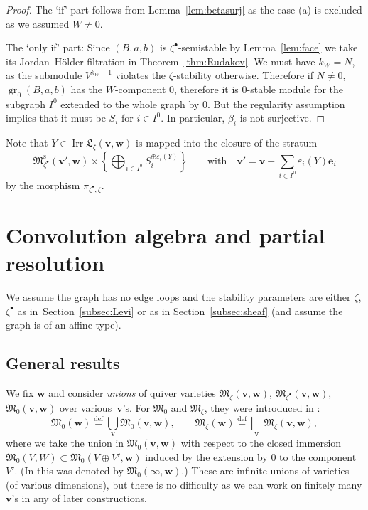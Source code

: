 \documentclass[pdftex]{sigma}
\theoremstyle{definition}
\numberwithin{equation}{section}
\newcommand{\thmref}[1]{Theorem~\ref{#1}}
\newcommand{\lemref}[1]{Lemma~\ref{#1}}
\newcommand{\subsecref}[1]{Section~\ref{#1}}
\newcommand{\defeq}{\overset{\operatorname{\scriptstyle def}}{=}}
\newcommand{\M}{{\mathfrak M}} %
\newcommand{\Mreg}{\M^{\operatorname{s}}}
\newcommand{\La}{{\mathfrak L}} %
\newcommand{\bv}{{\mathbf v}} %
\newcommand{\bw}{{\mathbf w}} %
\newcommand{\be}{{\mathbf e}}
\newcommand{\gr}{\operatorname{gr}} %
\newcommand{\Irr}{\operatorname{Irr}}
\begin{document}
\begin{proof}
The `if' part follows from \lemref{lem:betasurj} as the case (a) is
excluded as we assumed $W\neq 0$.

The `only if' part: Since $(B,a,b)$ is $\zeta^\bullet$-semistable by
\lemref{lem:face} we take its Jordan--H\"older f\/iltration in
\thmref{thm:Rudakov}. We must have $k_W = N$, as the submodule
$V^{k_W+1}$ violates the $\zeta$-stability otherwise. Therefore if $N
\neq 0$, $\gr_0(B,a,b)$ has the $W$-component $0$, therefore it is
$0$-stable module for the subgraph $I^0$ extended to the whole graph
by $0$. But the regularity assumption implies that it must be $S_i$
for $i\in I^0$. In particular, $\beta_i$ is not surjective.
\end{proof}

Note that $Y\in\Irr\La_\zeta(\bv,\bw)$ is mapped into the closure of
the stratum
\begin{equation*}
   \Mreg_{\zeta^\bullet}(\bv',\bw) \times \left\{ \bigoplus_{i\in I^0}
   S_i^{\oplus \varepsilon_i(Y)} \right\} \qquad\text{with}\quad
   \bv' = \bv - \sum_{i\in I^0} \varepsilon_i(Y) \be_i
\end{equation*}
by the morphism $\pi_{\zeta^\bullet,\zeta}$.

\section{Convolution algebra and partial resolution}\label{sec:convolution}

We assume the graph has no edge loops and the stability parameters are
either $\zeta$, $\zeta^\bullet$ as in~\subsecref{subsec:Levi} or as in
\subsecref{subsec:sheaf} (and assume the graph is of an af\/f\/ine type).

\subsection{General results}

We f\/ix $\bw$ and consider {\it unions\/} of quiver varieties
$\M_{\zeta}(\bv,\bw)$, $\M_{\zeta^\bullet}(\bv,\bw)$, $\M_0(\bv,\bw)$
over va\-rious~$\bv$'s.
%
For $\M_0$ and $\M_{\zeta}$, they were introduced in
\cite[Section~2.5]{Na-qaff}:
\begin{equation*}
   \M_{0}(\bw) \defeq \bigcup_{\bv} \M_{0}(\bv,\bw),\qquad
   \M_{\zeta}(\bw) \defeq \bigsqcup_{\bv} \M_{\zeta}(\bv,\bw),
\end{equation*}
where we take the union in $\M_0(\bv,\bw)$ with respect to the closed
immersion $\M_0(V,W)\subset\M_0(V\oplus V',\bw)$ induced by the
extension by $0$ to the component $V'$. (In \cite[Section~2.5]{Na-qaff}
this was denoted by $\M_0(\infty,\bw)$.) These are inf\/inite unions of
varieties (of various dimensions), but there is no dif\/f\/iculty as we
can work on f\/initely many $\bv$'s in any of later constructions.
\end{document}
